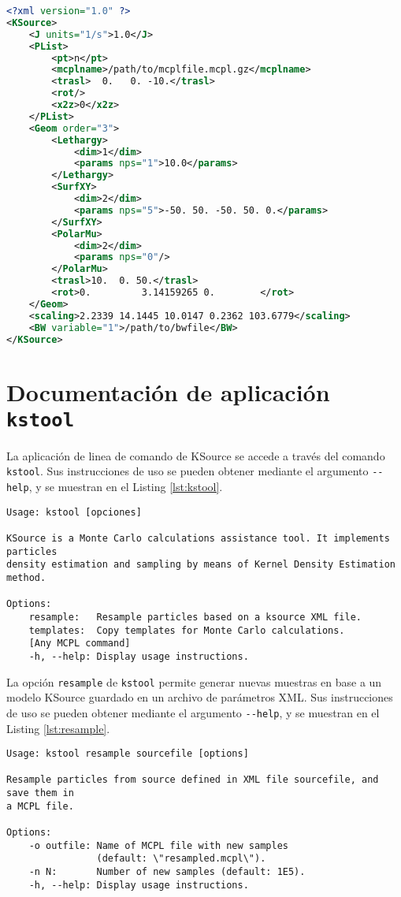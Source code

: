 \begin{lstlisting}[language=XML, label={lst:xmlfile}, caption=Ejemplo de archivo de parámetros XML.]
<?xml version="1.0" ?>
<KSource>
	<J units="1/s">1.0</J>
	<PList>
		<pt>n</pt>
		<mcplname>/path/to/mcplfile.mcpl.gz</mcplname>
		<trasl>  0.   0. -10.</trasl>
		<rot/>
		<x2z>0</x2z>
	</PList>
	<Geom order="3">
		<Lethargy>
			<dim>1</dim>
			<params nps="1">10.0</params>
		</Lethargy>
		<SurfXY>
			<dim>2</dim>
			<params nps="5">-50. 50. -50. 50. 0.</params>
		</SurfXY>
		<PolarMu>
			<dim>2</dim>
			<params nps="0"/>
		</PolarMu>
		<trasl>10.  0. 50.</trasl>
		<rot>0.         3.14159265 0.        </rot>
	</Geom>
	<scaling>2.2339 14.1445 10.0147 0.2362 103.6779</scaling>
	<BW variable="1">/path/to/bwfile</BW>
</KSource>
\end{lstlisting}




\section{Documentación de aplicación \texttt{kstool}}
\label{ap:CLI}

La aplicación de linea de comando de KSource se accede a través del comando \verb|kstool|. Sus instrucciones de uso se pueden obtener mediante el argumento \verb|--help|, y se muestran en el Listing \ref{lst:kstool}.

\begin{lstlisting}[label={lst:kstool}, caption=Instrucciones de uso del comando \texttt{kstool} (output de ``\texttt{kstool --help}'').]
Usage: kstool [opciones]

KSource is a Monte Carlo calculations assistance tool. It implements particles
density estimation and sampling by means of Kernel Density Estimation method.

Options:
	resample:   Resample particles based on a ksource XML file.
	templates:  Copy templates for Monte Carlo calculations.
	[Any MCPL command]
	-h, --help: Display usage instructions.
\end{lstlisting}

La opción \verb|resample| de \verb|kstool| permite generar nuevas muestras en base a un modelo KSource guardado en un archivo de parámetros XML. Sus instrucciones de uso se pueden obtener mediante el argumento \verb|--help|, y se muestran en el Listing \ref{lst:resample}.

\begin{lstlisting}[label={lst:resample}, caption=Instrucciones de uso del comando \texttt{kstool resample} (output de ``\texttt{kstool resample --help}'').]
Usage: kstool resample sourcefile [options]

Resample particles from source defined in XML file sourcefile, and save them in
a MCPL file.

Options:
	-o outfile: Name of MCPL file with new samples
	            (default: \"resampled.mcpl\").
	-n N:       Number of new samples (default: 1E5).
	-h, --help: Display usage instructions.
\end{lstlisting}

